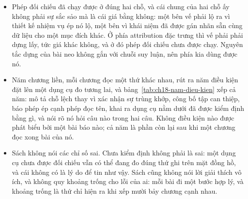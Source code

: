 \begin{tomtat}
\begin{itemize}
định nghĩa attribution đã được chọn rồi tính không sai số, nên nó so một lời giải
thích với một lời giải thích khác chứ không so lời giải thích với mô hình.
  \item Phép đối chiếu đã chạy được ở đúng hai chỗ, và cái chung của hai chỗ ấy
không phải sự sắc sảo mà là cái giá bằng không: một bên vế phải lộ ra vì thiết kế
nhiệm vụ ép nó lộ, một bên vì khái niệm đã được gán nhãn sẵn cùng dữ liệu cho một
mục đích khác. Ở phía attribution đặc trưng thì vế phải phải dựng lấy, tức giá
khác không, và ở đó phép đối chiếu chưa được chạy. Nguyên tắc dựng của bài neo
không gắn với chuỗi suy luận, nên phía kia dùng được nó.
  \item Năm chương liền, mỗi chương đọc một thứ khác nhau, rút ra năm điều kiện
đặt lên một dụng cụ đo tương lai, và bảng~\ref{tab:ch18-nam-dieu-kien} xếp cả năm:
mô tả chỗ lệch thay vì xác nhận sự trùng khớp, công bố tập can thiệp, báo phép ép
cạnh phép đọc tên, khai ra dụng cụ nằm dưới đã được kiểm định bằng gì, và nói rõ
nó hỏi câu nào trong hai câu. Không điều kiện nào được phát biểu bởi một bài báo
nào; cả năm là phần còn lại sau khi một chương đọc xong bài của nó.
  \item Sách không nói các chỉ số sai. Chưa kiểm định không phải là sai: một dụng
cụ chưa được đối chiếu vẫn có thể đang đo đúng thứ ghi trên mặt đồng hồ, và cái
không có là lý do để tin như vậy. Sách cũng không nói lời giải thích vô ích, và
không quy khoảng trống cho lỗi của ai: mỗi bài đi một bước hợp lý, và khoảng
trống là thứ chỉ hiện ra khi xếp mười bảy chương cạnh nhau.
\end{itemize}
\end{tomtat}

